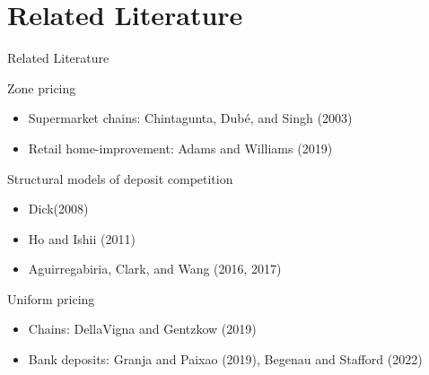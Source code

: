 \documentclass[notes,11pt, aspectratio=169]{beamer}
\newenvironment{wideitemize}{\itemize\addtolength{\itemsep}{10pt}}{\enditemize}
\begin{document}
\section{Related Literature}
\begin{frame}[label = lit]{Related Literature}



  \begin{wideitemize}
      \item Zone pricing
      
      \begin{itemize}
        \item Supermarket chains: Chintagunta, Dubé, and Singh (2003)
        \item Retail home-improvement: Adams and Williams (2019)
      \end{itemize}


          \item Structural models of deposit competition

          \begin{itemize}
            \item Dick(2008)
            \item Ho and Ishii (2011)
            \item Aguirregabiria, Clark, and Wang (2016, 2017)
          \end{itemize}
      
      \item Uniform pricing 
      
      \begin{itemize}
          \item Chains: DellaVigna and Gentzkow (2019)
          \item Bank deposits: Granja and Paixao (2019), Begenau and Stafford (2022)
      \end{itemize}

  \end{wideitemize}
  
\end{frame}






    
\end{document}
